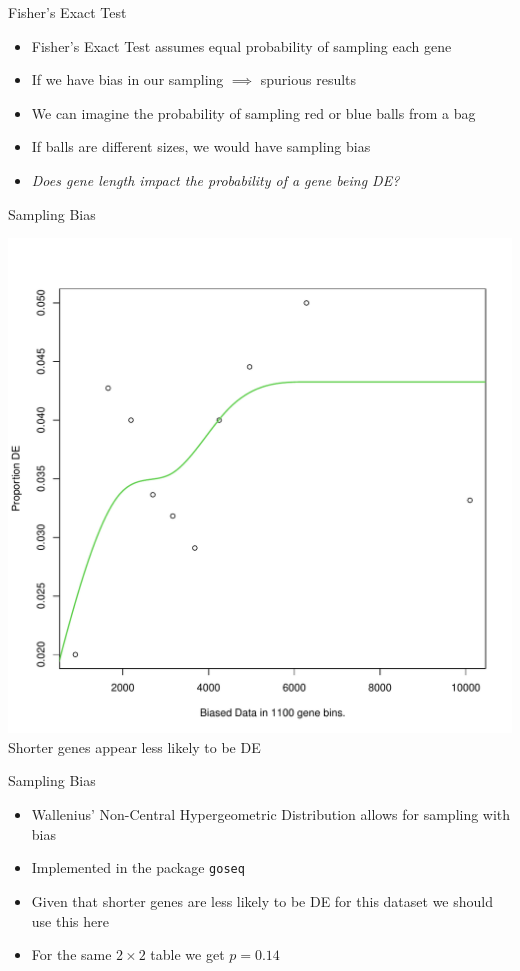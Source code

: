 \documentclass[11pt]{beamer}
\begin{document}
\begin{frame}{Fisher's Exact Test}
	\begin{itemize}
		\item Fisher's Exact Test assumes equal probability of sampling each gene
		\item If we have bias in our sampling $\implies$ spurious results
		\item We can imagine the probability of sampling red or blue balls from a bag
		\item If balls are different sizes, we would have sampling bias
		\item \textit{Does gene length impact the probability of a gene being DE?}
	\end{itemize}
\end{frame}

\begin{frame}{Sampling Bias}
		
	\centering
	\includegraphics[width=0.5\linewidth]{figures/SamplingBias.pdf} \\
	Shorter genes appear less likely to be DE\\[5mm]

\end{frame}

\begin{frame}{Sampling Bias}

	\begin{itemize}
		\item Wallenius’ Non-Central Hypergeometric Distribution allows for sampling with bias
		\item Implemented in the package \texttt{goseq}
		\item Given that shorter genes are less likely to be DE for this dataset we should use this here
		\item For the same $2\times2$ table we get $p = 0.14$\\[5mm]
	\end{itemize}
	
\end{frame}
\end{document}

